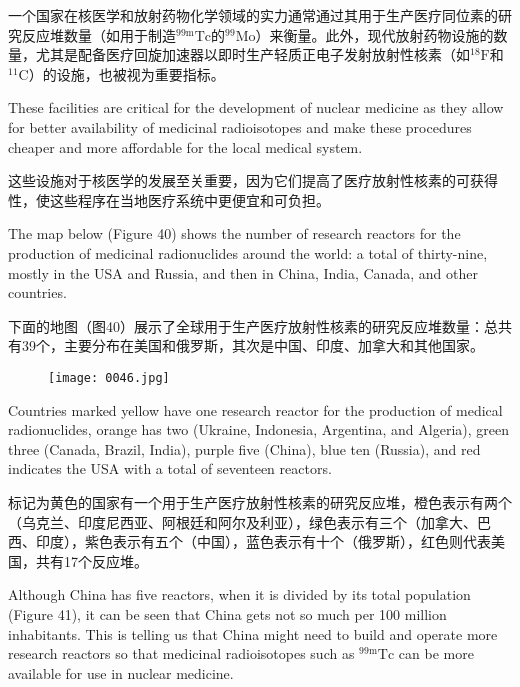 \documentclass[dvipsnames, svgnames,a4paper,11pt]{article}
\begin{document}
一个国家在核医学和放射药物化学领域的实力通常通过其用于生产医疗同位素的研究反应堆数量（如用于制造${}^\text{99m}\text{Tc}$的${}^\text{99}\text{Mo}$）来衡量。此外，现代放射药物设施的数量，尤其是配备医疗回旋加速器以即时生产轻质正电子发射放射性核素（如${}^\text{18}\text{F}$和${}^\text{11}\text{C}$）的设施，也被视为重要指标。

These facilities are critical for the development of nuclear medicine as they allow for better availability of medicinal radioisotopes and make these procedures cheaper and more affordable for the local medical system.  

这些设施对于核医学的发展至关重要，因为它们提高了医疗放射性核素的可获得性，使这些程序在当地医疗系统中更便宜和可负担。

The map below (Figure 40) shows the number of research reactors for the production of medicinal radionuclides around the world: a total of thirty-nine, mostly in the USA and Russia, and then in China, India, Canada, and other countries.  

下面的地图（图40）展示了全球用于生产医疗放射性核素的研究反应堆数量：总共有39个，主要分布在美国和俄罗斯，其次是中国、印度、加拿大和其他国家。

\begin{figure}[ht]
      \centering
      \texttt{[image: 0046.jpg]}
       \label{fig40}
\end{figure}

Countries marked yellow have one research reactor for the production of medical radionuclides, orange has two (Ukraine, Indonesia, Argentina, and Algeria), green three (Canada, Brazil, India), purple five (China), blue ten (Russia), and red indicates the USA with a total of seventeen reactors.  

标记为黄色的国家有一个用于生产医疗放射性核素的研究反应堆，橙色表示有两个（乌克兰、印度尼西亚、阿根廷和阿尔及利亚），绿色表示有三个（加拿大、巴西、印度），紫色表示有五个（中国），蓝色表示有十个（俄罗斯），红色则代表美国，共有17个反应堆。

Although China has five reactors, when it is divided by its total population (Figure 41), it can be seen that China gets not so much per 100 million inhabitants. This is telling us that China might need to build and operate more research reactors so that medicinal radioisotopes such as \(\mathrm{^{99m}Tc}\) can be more available for use in nuclear medicine.  
\end{document}
